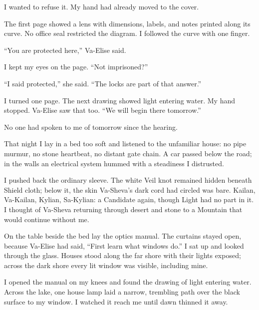 I wanted to refuse it. My hand had already moved to the cover.\par

The first page showed a lens with dimensions, labels, and notes printed along its curve. No office seal restricted the diagram. I followed the curve with one finger.\par

``You are protected here,'' Va-Elise said.\par

I kept my eyes on the page. ``Not imprisoned?''\par

``I said protected,'' she said. ``The locks are part of that answer.''\par

I turned one page. The next drawing showed light entering water. My hand stopped. Va-Elise saw that too. ``We will begin there tomorrow.''\par

No one had spoken to me of tomorrow since the hearing.\par

\ornament

That night I lay in a bed too soft and listened to the unfamiliar house: no pipe murmur, no stone heartbeat, no distant gate chain. A car passed below the road; in the walls an electrical system hummed with a steadiness I distrusted.\par

I pushed back the ordinary sleeve. The white Veil knot remained hidden beneath Shield cloth; below it, the skin Va-Sheva's dark cord had circled was bare. Kailan, Va-Kailan, Kylian, Sa-Kylian: a Candidate again, though Light had no part in it. I thought of Va-Sheva returning through desert and stone to a Mountain that would continue without me.\par

On the table beside the bed lay the optics manual. The curtains stayed open, because Va-Elise had said, ``First learn what windows do.'' I sat up and looked through the glass. Houses stood along the far shore with their lights exposed; across the dark shore every lit window was visible, including mine.\par

I opened the manual on my knees and found the drawing of light entering water. Across the lake, one house lamp laid a narrow, trembling path over the black surface to my window. I watched it reach me until dawn thinned it away.\par

